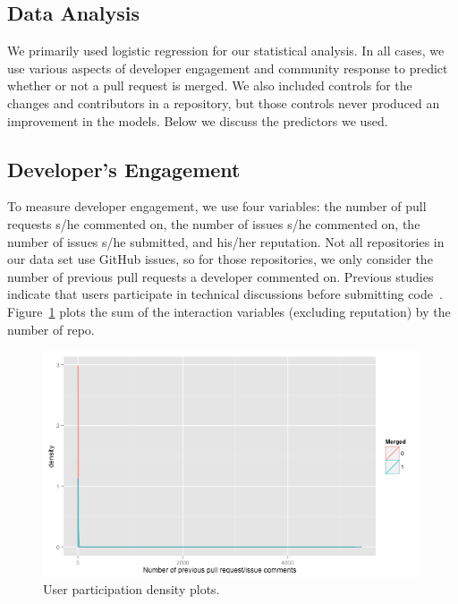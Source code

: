 \documentclass{sigchi}
\begin{document}
\subsection{Data Analysis} \label{sec:data_analysis} We primarily used logistic
regression for our statistical analysis. In all cases, we use various aspects of
developer engagement and community response to predict whether or not a pull
request is merged. We also included controls for the changes and contributors in
a repository, but those controls never produced an improvement in the models.
Below we discuss the predictors we used.

\subsection{Developer's Engagement} To measure developer engagement, we use four
variables: the number of pull requests s/he commented on, the number of issues
s/he commented on, the number of issues s/he submitted, and his/her reputation.
Not all repositories in our data set use GitHub issues, so for those
repositories, we only consider the number of previous pull requests a developer
commented on. Previous studies indicate that users participate in technical
discussions before submitting code~\cite{von_krogh_community_2003}.
Figure~\ref{fig:up} plots the sum of the interaction variables (excluding
reputation) by the number of repo.

\begin{figure}[p] \centering
\includegraphics[width=0.9\columnwidth]{figures/number_comments_density_ggplot.png}
\caption{User participation density plots.} \label{fig:up} \end{figure}
\end{document}
